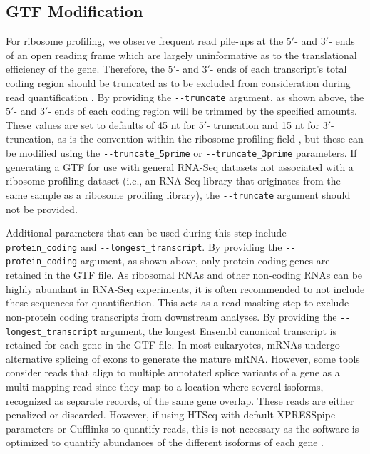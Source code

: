 \documentclass[10pt, oneside]{article}
\begin{document}
\begin{multicols}{2}
\subsection*{GTF Modification}
For ribosome profiling, we observe frequent read pile-ups at the $5'$- and $3'$- ends of an open reading frame which are largely uninformative as to the translational efficiency of the gene. Therefore, the $5'$- and $3'$- ends of each transcript's total coding region should be truncated as to be excluded from consideration during read quantification \cite{ingolia_meth, weinberg_reports}. By providing the \texttt{-{}-truncate} argument, as shown above, the $5'$- and $3'$- ends of each coding region will be trimmed by the specified amounts. These values are set to defaults of 45 nt for $5'$- truncation and 15 nt for $3'$- truncation, as is the convention within the ribosome profiling field \cite{ingolia_meth}, but these can be modified using the \texttt{-{}-truncate\_5prime} or \texttt{-{}-truncate\_3prime} parameters. If generating a GTF for use with general RNA-Seq datasets not associated with a ribosome profiling dataset (i.e., an RNA-Seq library that originates from the same sample as a ribosome profiling library), the \texttt{-{}-truncate} argument should not be provided. \par

Additional parameters that can be used during this step include \texttt{-{}-protein\_coding} and \texttt{-{}-longest\_transcript}. By providing the \texttt{-{}-protein\_coding} argument, as shown above, only protein-coding genes are retained in the GTF file. As ribosomal RNAs and other non-coding RNAs can be highly abundant in RNA-Seq experiments, it is often recommended to not include these sequences for quantification. This acts as a read masking step to exclude non-protein coding transcripts from downstream analyses. By providing the \texttt{-{}-longest\_transcript} argument, the longest Ensembl canonical transcript \cite{ensembl_canon} is retained for each gene in the GTF file. In most eukaryotes, mRNAs undergo alternative splicing of exons to generate the mature mRNA. However, some tools consider reads that align to multiple annotated splice variants of a gene as a multi-mapping read since they map to a location where several isoforms, recognized as separate records, of the same gene overlap. These reads are either penalized or discarded. However, if using HTSeq with default XPRESSpipe parameters or Cufflinks to quantify reads, this is not necessary as the software is optimized to quantify abundances of the different isoforms of each gene \cite{cufflinks}. \par


\end{multicols}
\end{document}
